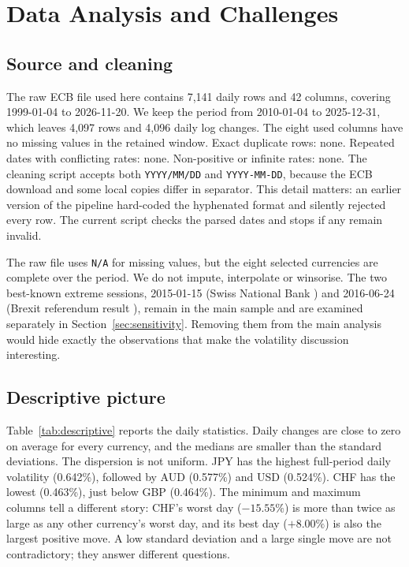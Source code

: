 \documentclass[journal]{IEEEtran}
\begin{document}
\section{Data Analysis and Challenges}
\label{sec:data}

\subsection{Source and cleaning}
The raw ECB file \cite{ecb} used here contains 7,141 daily rows and 42 columns, covering 1999-01-04 to 2026-11-20. We keep the period from 2010-01-04 to 2025-12-31, which leaves 4,097 rows and 4,096 daily log changes. The eight used columns have no missing values in the retained window. Exact duplicate rows: none. Repeated dates with conflicting rates: none. Non-positive or infinite rates: none. The cleaning script accepts both \texttt{YYYY/MM/DD} and \texttt{YYYY-MM-DD}, because the ECB download and some local copies differ in separator. This detail matters: an earlier version of the pipeline hard-coded the hyphenated format and silently rejected every row. The current script checks the parsed dates and stops if any remain invalid.

The raw file uses \texttt{N/A} for missing values, but the eight selected currencies are complete over the period. We do not impute, interpolate or winsorise. The two best-known extreme sessions, 2015-01-15 (Swiss National Bank \cite{snb2015}) and 2016-06-24 (Brexit referendum result \cite{ec2016}), remain in the main sample and are examined separately in Section~\ref{sec:sensitivity}. Removing them from the main analysis would hide exactly the observations that make the volatility discussion interesting.

\subsection{Descriptive picture}
Table~\ref{tab:descriptive} reports the daily statistics. Daily changes are close to zero on average for every currency, and the medians are smaller than the standard deviations. The dispersion is not uniform. JPY has the highest full-period daily volatility (0.642\%), followed by AUD (0.577\%) and USD (0.524\%). CHF has the lowest (0.463\%), just below GBP (0.464\%). The minimum and maximum columns tell a different story: CHF's worst day ($-15.55\%$) is more than twice as large as any other currency's worst day, and its best day ($+8.00\%$) is also the largest positive move. A low standard deviation and a large single move are not contradictory; they answer different questions.
\end{document}
